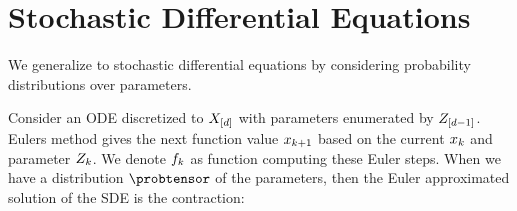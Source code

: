 \section{Stochastic Differential Equations}

We generalize to stochastic differential equations by considering probability distributions over parameters.

\begin{example}
    Consider an ODE discretized to $X_{[d]}$ with parameters enumerated by $Z_{[d-1]}$.
    Eulers method gives the next function value $x_{k+1}$ based on the current $x_{k}$ and parameter $Z_{k}$.
    We denote $f_{k}$ as function computing these Euler steps.
    When we have a distribution $\probtensor$ of the parameters, then the Euler approximated solution of the SDE is the contraction:
\end{example}
